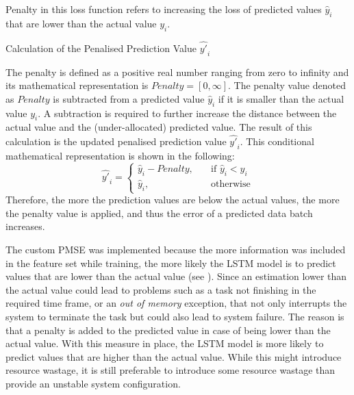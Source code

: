     Penalty in this loss function refers to increasing the loss of predicted values $\hat{y}_i$ that are lower than the actual value $y_i$.

    \begin{pabox}{Calculation of the Penalised Prediction Value $\hat{y'}_i$}
    \label{def:calculation-of-the-penalty-value}

      The penalty is defined as a positive real number ranging from zero to infinity and its mathematical representation is $Penalty = [0, \infty]$.
      The penalty value denoted as $Penalty$ is subtracted from a predicted value $\hat{y}_i$ if it is smaller than the actual value $y_i$. A subtraction is required to further increase the distance between the actual value and the (under-allocated) predicted value.
      The result of this calculation is the updated penalised prediction value $\hat{y'}_i$.
      This conditional mathematical representation is shown in the following:
      $$\hat{y'}_i = 
      \begin{cases}
        \hat{y}_i - Penalty, & \quad \textrm{if } \hat{y}_i < y_i \\
        \hat{y}_i,  & \quad \textrm{otherwise}
      \end{cases}$$
      Therefore, the more the prediction values are below the actual values, the more the penalty value is applied, and thus the error of a predicted data batch increases.

    \end{pabox}

    The custom PMSE was implemented because the more information was included in the feature set while training, the more likely the LSTM model is to predict values that are lower than the actual value (see ). Since an estimation lower than the actual value could lead to problems such as a task not finishing in the required time frame, or an \emph{out of memory} exception, that not only interrupts the system to terminate the task but could also lead to system failure. The reason is that a penalty is added to the predicted value in case of being lower than the actual value. With this measure in place, the LSTM model is more likely to predict values that are higher than the actual value. While this might introduce resource wastage, it is still preferable to introduce some resource wastage than provide an unstable system configuration.

